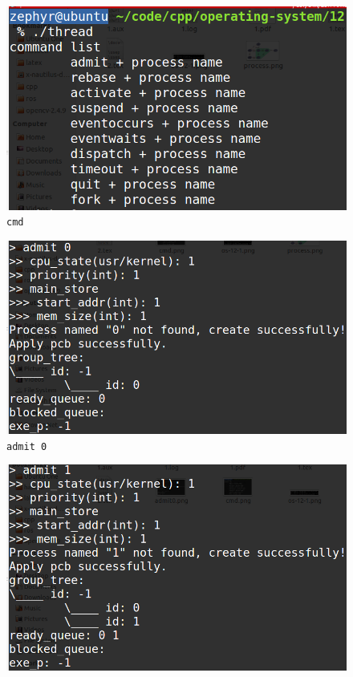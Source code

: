\documentclass[11pt]{article}
\begin{document}
\begin{center}
\begin{figure}[htbp]
\includegraphics[width=\textwidth]{cmd.png}
\caption{\texttt{cmd}}
\label{fig: cmd}
\end{figure}
\begin{figure}[htbp]
\includegraphics[width=\textwidth]{admit0.png}
\caption{\texttt{admit 0}}
\label{fig: admit0}
\end{figure}
\begin{figure}[htbp]
\includegraphics[width=\textwidth]{admit1.png}

\end{figure}
\end{center}
\end{document}
